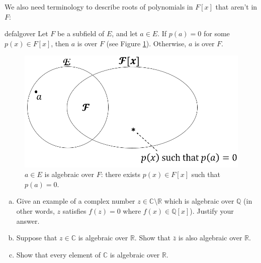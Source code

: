 
We also need terminology to describe roots of polynomials in $F[x]$ that aren't in $F$:

\begin{defn}{defalgover}  
Let $F$ be a subfield of $E$, and let $a\in E$. If $p(a)=0$ for some $p(x) \in F[x]$, then $a$ is  over $F$ (see Figure \ref{algebraicelement}). Otherwise, $a$  is  over $F$.
\end{defn}

\begin{figure}
\begin{center}
\includegraphics[scale=0.35]{images/algebraic_element.png}
\caption{$a\in E$ is algebraic over $F$:  there exists $p(x)\in F[x]$ such that $p(a)=0$.}\label{algebraicelement}
\end{center}
\end{figure}

\begin{exercise}{}
\begin {enumerate}[(a)]
\item
Give an example of a complex number $z \in \mathbb{C}\setminus \mathbb{R}$ which is algebraic over $\mathbb{Q}$ (in other words, $z$ satisfies $f(z)=0$ where $f(x) \in \mathbb Q[x]$). Justify your answer.
\item
Suppose that $z \in \mathbb{C}$ is algebraic over $\mathbb{R}$. Show that $\bar{z}$ is also algebraic over $\mathbb{R}$.
\item
Show that every element of $\mathbb{C}$ is algebraic over $\mathbb{R}$.
\end{enumerate}
\end{exercise}


